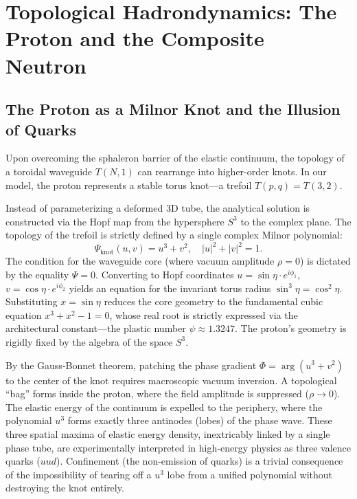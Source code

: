 \documentclass[12pt,a4paper]{article}
\begin{document}
\section{Topological Hadrondynamics: The Proton and the Composite Neutron}

\subsection{The Proton as a Milnor Knot and the Illusion of Quarks}
Upon overcoming the sphaleron barrier of the elastic continuum, the topology of a toroidal waveguide $T(N,1)$ can rearrange into higher-order knots. In our model, the proton represents a stable torus knot—a trefoil $T(p,q) = T(3,2)$. 

Instead of parameterizing a deformed 3D tube, the analytical solution is constructed via the Hopf map from the hypersphere $S^3$ to the complex plane. The topology of the trefoil is strictly defined by a single complex Milnor polynomial:
\begin{equation}
	\Psi_{\text{knot}}(u, v) = u^3 + v^2, \quad |u|^2 + |v|^2 = 1.
\end{equation}
The condition for the waveguide core (where vacuum amplitude $\rho = 0$) is dictated by the equality $\Psi = 0$. Converting to Hopf coordinates $u = \sin\eta \cdot e^{i\phi_1}$, $v = \cos\eta \cdot e^{i\phi_2}$ yields an equation for the invariant torus radius $\sin^3\eta = \cos^2\eta$. Substituting $x = \sin\eta$ reduces the core geometry to the fundamental cubic equation $x^3 + x^2 - 1 = 0$, whose real root is strictly expressed via the architectural constant—the plastic number $\psi \approx 1.3247$. The proton's geometry is rigidly fixed by the algebra of the space $S^3$.

By the Gauss-Bonnet theorem, patching the phase gradient $\Phi = \arg(u^3 + v^2)$ to the center of the knot requires macroscopic vacuum inversion. A topological ``bag'' forms inside the proton, where the field amplitude is suppressed ($\rho \to 0$). The elastic energy of the continuum is expelled to the periphery, where the polynomial $u^3$ forms exactly three antinodes (lobes) of the phase wave. These three spatial maxima of elastic energy density, inextricably linked by a single phase tube, are experimentally interpreted in high-energy physics as three valence quarks ($uud$). Confinement (the non-emission of quarks) is a trivial consequence of the impossibility of tearing off a $u^3$ lobe from a unified polynomial without destroying the knot entirely.
\end{document}

